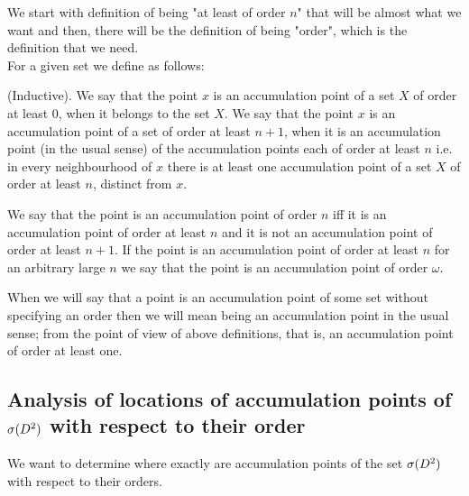 We start with definition of being "at least of order $n$" that will be almost what we want
and then, there will be the definition of being "order", which is the definition that we need. \\
For a given set we define as follows:
\begin{definition}
(Inductive). 
We say that the point $x$ is an accumulation point of a set $X$ 
of order at least $0$, when it belongs to the set $X$. 
We say that the point $x$ is an accumulation point of a set 
of order at least $n + 1$, when it is 
an accumulation point (in the usual sense) of the accumulation points each of order at least 
$n$ i.e. in every neighbourhood of $x$ there is at least one accumulation point of a set $X$ 
of order at least $n$, distinct from $x$. 
\end{definition}  
\begin{definition}
We say that the point is an accumulation point of order $n$ iff it is an accumulation point 
of order at least $n$ and it is not an accumulation point of order at least $n+1$. 
If the point is an accumulation point of order at least $n$ for an arbitrary large 
$n$ we say that 
the point is an accumulation point of order $\omega$.
\end{definition}
When we will say that a point is an accumulation point of some set without specifying an order 
then we will mean being an accumulation point in the usual sense; from the point of view 
of above definitions, that is, an accumulation point of order at least one.

\subsection{Analysis of locations of accumulation points of ${{\sigma}(D^2)}$ with respect to their order}
We want to determine where exactly are accumulation points of the set ${{\sigma}(D^2)}$ with 
respect to their orders. 

